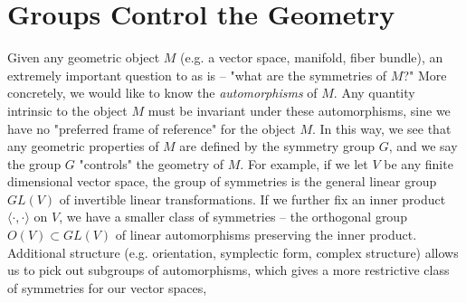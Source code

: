 \documentclass[abstract=on,twoside]{scrreprt}
\begin{document}
\section*{Groups Control the Geometry}
%
Given any geometric object $M$ (e.g. a vector space, manifold, fiber bundle), an
extremely important question to as is -- "what are the symmetries of $M$?" More
concretely, we would like to know the \emph{automorphisms} of $M$. Any quantity
intrinsic to the object $M$ must be invariant under these automorphisms, sine
we have no "preferred frame of reference" for the object $M$. In this way, we
see that any geometric properties of $M$ are defined by the symmetry group $G$,
and we say the group $G$ "controls" the geometry of $M$. For example, if we let
$V$ be any finite dimensional vector space, the group of symmetries is the general
linear group $GL(V)$ of invertible linear transformations. If we further fix an
inner product $\langle\cdot,\cdot\rangle$ on $V$, we have a smaller class of
symmetries -- the orthogonal group $O(V) \subset GL(V)$ of linear automorphisms
preserving the inner product. Additional structure (e.g. orientation, symplectic
form, complex structure) allows us to pick out subgroups  of automorphisms, which gives
a more restrictive class of symmetries for our vector spaces, \\
\end{document}
